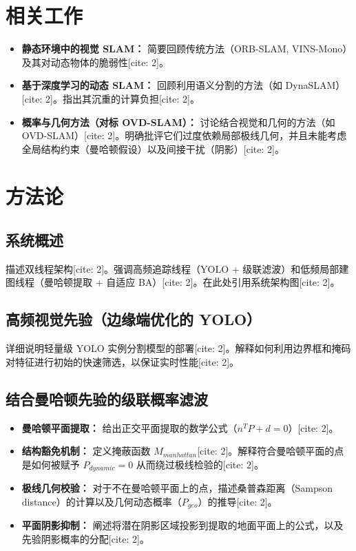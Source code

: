 \documentclass[12pt,a4paper]{ctexart}
\begin{document}
\section{相关工作}
\begin{itemize}
    \item \textbf{静态环境中的视觉 SLAM：} 简要回顾传统方法（ORB-SLAM, VINS-Mono）及其对动态物体的脆弱性[cite: 2]。
    \item \textbf{基于深度学习的动态 SLAM：} 回顾利用语义分割的方法（如 DynaSLAM）[cite: 2]。指出其沉重的计算负担[cite: 2]。
    \item \textbf{概率与几何方法（对标 OVD-SLAM）：} 讨论结合视觉和几何的方法（如 OVD-SLAM）[cite: 2]。明确批评它们过度依赖局部极线几何，并且未能考虑全局结构约束（曼哈顿假设）以及间接干扰（阴影）[cite: 2]。
\end{itemize}

\section{方法论}
\subsection{系统概述}
描述双线程架构[cite: 2]。强调高频追踪线程（YOLO + 级联滤波）和低频局部建图线程（曼哈顿提取 + 自适应 BA）[cite: 2]。在此处引用系统架构图[cite: 2]。

\subsection{高频视觉先验（边缘端优化的 YOLO）}
详细说明轻量级 YOLO 实例分割模型的部署[cite: 2]。解释如何利用边界框和掩码对特征进行初始的快速筛选，以保证实时性能[cite: 2]。

\subsection{结合曼哈顿先验的级联概率滤波}
\begin{itemize}
    \item \textbf{曼哈顿平面提取：} 给出正交平面提取的数学公式（$n^T P+d=0$）[cite: 2]。
    \item \textbf{结构豁免机制：} 定义掩蔽函数 $M_{manhattan}$[cite: 2]。解释符合曼哈顿平面的点是如何被赋予 $P_{dynamic}=0$ 从而绕过极线检验的[cite: 2]。
    \item \textbf{极线几何校验：} 对于不在曼哈顿平面上的点，描述桑普森距离（Sampson distance）的计算以及几何动态概率（$P_{geo}$）的推导[cite: 2]。
    \item \textbf{平面阴影抑制：} 阐述将潜在阴影区域投影到提取的地面平面上的公式，以及先验阴影概率的分配[cite: 2]。
\end{itemize}
\end{document}
